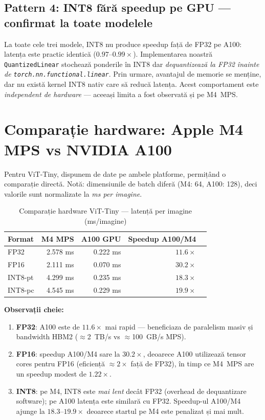 \documentclass[12pt,a4paper]{article}
\begin{document}
\subsection{Pattern 4: INT8 fără speedup pe GPU --- confirmat la toate modelele}

La toate cele trei modele, INT8 nu produce speedup față de FP32 pe A100:
latența este practic identică ($0.97$--$0.99\times$). Implementarea noastră
\texttt{QuantizedLinear} stochează ponderile în INT8 dar \emph{dequantizează
la FP32 înainte de \texttt{torch.nn.functional.linear}}. Prin urmare,
avantajul de memorie se menține, dar nu există kernel INT8 nativ care să
reducă latența. Acest comportament este \emph{independent de hardware} ---
aceeași limita a fost observată și pe M4~MPS.

\section{Comparație hardware: Apple M4 MPS vs NVIDIA A100}

Pentru ViT-Tiny, dispunem de date pe ambele platforme, permițând o comparație
directă. Notă: dimensiunile de batch diferă (M4: 64, A100: 128), deci
valorile sunt normalizate la \emph{ms per imagine}.

\begin{table}[H]
  \centering
  \caption{Comparație hardware ViT-Tiny --- latență per imagine (ms/imagine)}
  \begin{tabular}{lrrrr}
    \toprule
    \textbf{Format} & \textbf{M4 MPS} & \textbf{A100 GPU} &
    \textbf{Speedup A100/M4} \\
    \midrule
    FP32    & 2.578 ms & 0.222 ms & $\mathbf{11.6\times}$ \\
    FP16    & 2.111 ms & 0.070 ms & $\mathbf{30.2\times}$ \\
    INT8-pt & 4.299 ms & 0.235 ms & $\mathbf{18.3\times}$ \\
    INT8-pc & 4.545 ms & 0.229 ms & $\mathbf{19.9\times}$ \\
    \bottomrule
  \end{tabular}
  \label{tab:hardware}
\end{table}

\textbf{Observații cheie:}
\begin{enumerate}
  \item \textbf{FP32}: A100 este de $11.6\times$ mai rapid --- beneficiaza
    de paralelism masiv și bandwidth HBM2 ($\approx$2~TB/s vs $\approx$100~GB/s MPS).
  \item \textbf{FP16}: speedup A100/M4 sare la $30.2\times$, deoarece
    A100 utilizează tensor cores pentru FP16 (eficiență $\approx 2\times$
    față de FP32), în timp ce M4~MPS are un speedup modest de $1.22\times$.
  \item \textbf{INT8}: pe M4, INT8 este \emph{mai lent} decât FP32 (overhead
    de dequantizare software); pe A100 latența este similară cu FP32.
    Speedup-ul A100/M4 ajunge la $18.3$--$19.9\times$ deoarece startul
    pe M4 este penalizat și mai mult.
\end{enumerate}
\end{document}
